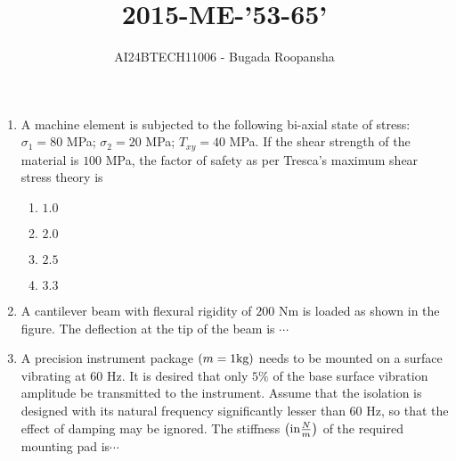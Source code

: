 \documentclass[journal,12pt,twocolumn]{IEEEtran}
\theoremstyle{remark}
\begin{document}

\vspace{3cm}
\title{2015-ME-'53-65'}
\author{AI24BTECH11006 - Bugada Roopansha}
\maketitle

\begin{enumerate}[start=53]
 
    \item A machine element is subjected to the following bi-axial state of stress: $\sigma_1 = 80$ MPa; $\sigma_2 = 20$ MPa; $T_{xy} = 40$ MPa. If the shear strength of the material is $100$ MPa, the factor of safety as per Tresca's maximum shear stress theory is
    \begin{enumerate}
        \item $1.0$
        \item $2.0$
        \item $2.5$
        \item $3.3$
    \end{enumerate} 


    \item A cantilever beam with flexural rigidity of $200$ Nm is loaded as shown in the figure. The deflection  at the tip of the beam is $\cdots$

\begin{center}
\end{center}

 \item A precision instrument package $\left(m = 1 \text{kg}\right)$ needs to be mounted on a surface vibrating at $60$ Hz. It is desired that only $5\%$ of the base surface vibration amplitude be transmitted to the instrument. Assume that the isolation is designed with its natural frequency significantly lesser than $60$ Hz, so that the effect of damping may be ignored. The stiffness $\left(\text{in}\frac{N}{m}\right)$ of the required mounting pad is$\cdots$


\end{enumerate}
\end{document}
